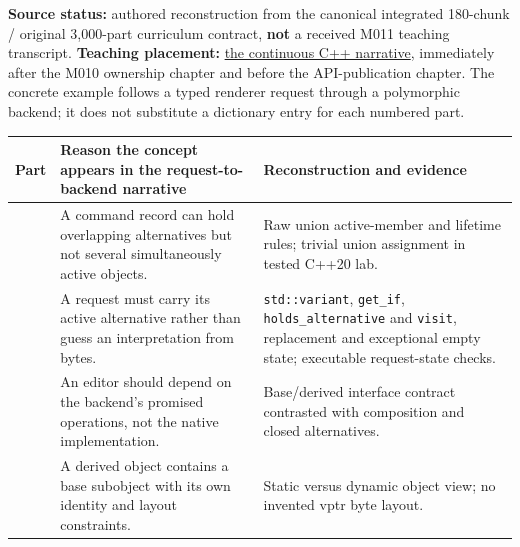 \hypertarget{appendix-fd090d982a15-m011-parts-161180-a-request-changes-shape-and-a-backend-changes-implementation}{}

\textbf{Source status:} authored reconstruction from the canonical integrated 180-chunk / original 3,000-part curriculum contract, \textbf{not} a received M011 teaching transcript. \textbf{Teaching placement:} \hyperref[01-foundations-i-ch004-from-one-owned-resource-to-many-requests-and-a-replaceable-backend]{the continuous C++ narrative}, immediately after the M010 ownership chapter and before the API-publication chapter. The concrete example follows a typed renderer request through a polymorphic backend; it does not substitute a dictionary entry for each numbered part.

{\def\LTcaptype{none} %
\begin{longtable}[]{@{}
  >{\raggedright\arraybackslash}p{}
  >{\raggedright\arraybackslash}p{}
  >{\raggedright\arraybackslash}p{}@{}}
\toprule\noalign{}
\begin{minipage}[b]{\linewidth}\raggedright
Part
\end{minipage} & \begin{minipage}[b]{\linewidth}\raggedright
Reason the concept appears in the request-to-backend narrative
\end{minipage} & \begin{minipage}[b]{\linewidth}\raggedright
Reconstruction and evidence
\end{minipage} \\
\midrule\noalign{}
\endhead
\bottomrule\noalign{}
\endlastfoot
161 & A command record can hold overlapping alternatives but not several simultaneously active objects. & Raw union active-member and lifetime rules; trivial union assignment in tested C++20 lab. \\
162 & A request must carry its active alternative rather than guess an interpretation from bytes. & \texttt{std::variant}, \texttt{get\_if}, \texttt{holds\_alternative} and \texttt{visit}, replacement and exceptional empty state; executable request-state checks. \\
163 & An editor should depend on the backend's promised operations, not the native implementation. & Base/derived interface contract contrasted with composition and closed alternatives. \\
164 & A derived object contains a base subobject with its own identity and layout constraints. & Static versus dynamic object view; no invented vptr byte layout. \\

\end{longtable}}
